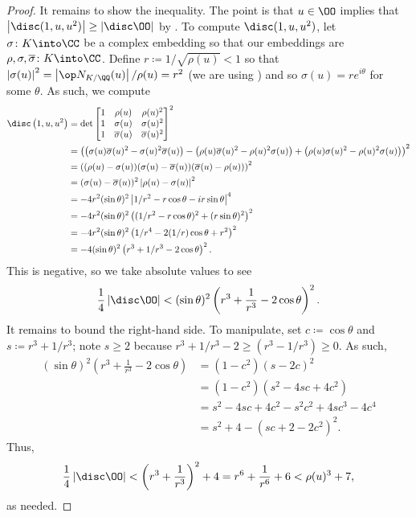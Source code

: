 \documentclass[../notes.tex]{subfiles}
\begin{document}
\begin{proof}
	It remains to show the inequality. The point is that $u\in\OO$ implies that $\left|\disc(1,u,u^2)\right|\ge\left|\disc\OO\right|$ by . To compute $\disc(1,u,u^2)$, let $\sigma\colon K\into\CC$ be a complex embedding so that our embeddings are $\rho,\sigma,\overline\sigma\colon K\into\CC$. Define $r\coloneqq1/\sqrt{\rho(u)}<1$ so that $\left|\sigma(u)\right|^2=\left|\op N_{K/\QQ}(u)\right|/\rho(u)=r^2$ (we are using ) and so $\sigma(u)=re^{i\theta}$ for some $\theta$. As such, we compute
	\begin{align*}
		\disc\left(1,u,u^2\right) &= \det\begin{bmatrix}
			1 & \rho(u) & \rho(u)^2 \\
			1 & \sigma(u) & \sigma(u)^2 \\
			1 & \overline\sigma(u) & \overline\sigma(u)^2
		\end{bmatrix}^2 \\
		&= \left(\left(\sigma(u)\overline\sigma(u)^2-\sigma(u)^2\overline\sigma(u)\right)-\left(\rho(u)\overline\sigma(u)^2-\rho(u)^2\sigma(u)\right)+\left(\rho(u)\sigma(u)^2-\rho(u)^2\sigma(u)\right)\right)^2 \\
		&= \left((\rho(u)-\sigma(u))(\sigma(u)-\overline\sigma(u))(\overline\sigma(u)-\rho(u))\right)^2 \\
		&= (\sigma(u)-\overline\sigma(u))^2\left|\rho(u)-\sigma(u)\right|^2 \\
		&= -4r^2(\sin\theta)^2\left|1/r^2-r\cos\theta-ir\sin\theta\right|^4 \\
		&= -4r^2(\sin\theta)^2\left((1/r^2-r\cos\theta)^2+(r\sin\theta)^2\right)^2 \\
		&= -4r^2(\sin\theta)^2\left(1/r^4-2(1/r)\cos\theta+r^2\right)^2 \\
		&= -4(\sin\theta)^2\left(r^3+1/r^3-2\cos\theta\right)^2.
	\end{align*}
	This is negative, so we take absolute values to see
	\[\frac14\left|\disc\OO\right|<(\sin\theta)^2\left(r^3+\frac1{r^3}-2\cos\theta\right)^2.\]
	It remains to bound the right-hand side. To manipulate, set $c\coloneqq\cos\theta$ and $s\coloneqq r^3+1/r^3$; note $s\ge2$ because $r^3+1/r^3-2\ge\left(r^3-1/r^3\right)\ge0$. As such,
	\begin{align*}
		(\sin\theta)^2\left(r^3+\frac1{r^3}-2\cos\theta\right) &= \left(1-c^2\right)(s-2c)^2 \\
		&= \left(1-c^2\right)\left(s^2-4sc+4c^2\right) \\
		&= s^2-4sc+4c^2-s^2c^2+4sc^3-4c^4 \\
		&= s^2+4-\left(sc+2-2c^2\right)^2.
	\end{align*}
	Thus,
	\[\frac14\left|\disc\OO\right|<\left(r^3+\frac1{r^3}\right)^2+4=r^6+\frac1{r^6}+6<\rho(u)^3+7,\]
	as needed.
\end{proof}
\end{document}
